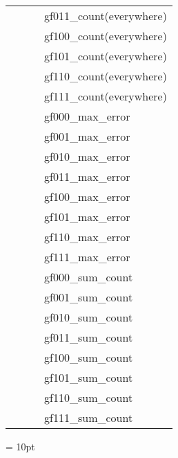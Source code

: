 \begin{tabular*}{160mm}{cll}
~& ~ &gf011\_count(everywhere)\\ 
~& ~ &gf100\_count(everywhere)\\ 
~& ~ &gf101\_count(everywhere)\\ 
~& ~ &gf110\_count(everywhere)\\ 
~& ~ &gf111\_count(everywhere)\\ 
~& ~ &gf000\_max\_error\\ 
~& ~ &gf001\_max\_error\\ 
~& ~ &gf010\_max\_error\\ 
~& ~ &gf011\_max\_error\\ 
~& ~ &gf100\_max\_error\\ 
~& ~ &gf101\_max\_error\\ 
~& ~ &gf110\_max\_error\\ 
~& ~ &gf111\_max\_error\\ 
~& ~ &gf000\_sum\_count\\ 
~& ~ &gf001\_sum\_count\\ 
~& ~ &gf010\_sum\_count\\ 
~& ~ &gf011\_sum\_count\\ 
~& ~ &gf100\_sum\_count\\ 
~& ~ &gf101\_sum\_count\\ 
~& ~ &gf110\_sum\_count\\ 
~& ~ &gf111\_sum\_count\\ 
\end{tabular*} 



\vspace{5mm}\parskip = 10pt 

